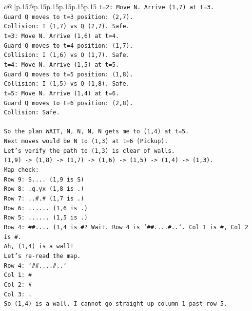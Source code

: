 \documentclass{article}
\begin{document}
{\begin{supertabular}{c@{$\;$}|p{.15\linewidth}@{}p{.15\linewidth}p{.15\linewidth}p{.15\linewidth}p{.15\linewidth}p{.15\linewidth}}
{{{\texttt{t=2: Move N. Arrive (1,7) at t=3.} \\
\texttt{Guard Q moves to t=3 position: (2,7).} \\
\texttt{Collision: I (1,7) vs Q (2,7). Safe.} \\
\texttt{t=3: Move N. Arrive (1,6) at t=4.} \\
\texttt{Guard Q moves to t=4 position: (1,7).} \\
\texttt{Collision: I (1,6) vs Q (1,7). Safe.} \\
\texttt{t=4: Move N. Arrive (1,5) at t=5.} \\
\texttt{Guard Q moves to t=5 position: (1,8).} \\
\texttt{Collision: I (1,5) vs Q (1,8). Safe.} \\
\texttt{t=5: Move N. Arrive (1,4) at t=6.} \\
\texttt{Guard Q moves to t=6 position: (2,8).} \\
\texttt{Collision: Safe.} \\
\\ 
\texttt{So the plan WAIT, N, N, N, N gets me to (1,4) at t=5.} \\
\texttt{Next moves would be N to (1,3) at t=6 (Pickup).} \\
\texttt{Let's verify the path to (1,3) is clear of walls.} \\
\texttt{(1,9) {-}> (1,8) {-}> (1,7) {-}> (1,6) {-}> (1,5) {-}> (1,4) {-}> (1,3).} \\
\texttt{Map check:} \\
\texttt{Row 9: S.... (1,9 is S)} \\
\texttt{Row 8: .q.yx (1,8 is .)} \\
\texttt{Row 7: ..\#.\# (1,7 is .)} \\
\texttt{Row 6: ...... (1,6 is .)} \\
\texttt{Row 5: ...... (1,5 is .)} \\
\texttt{Row 4: \#\#.... (1,4 is \#? Wait. Row 4 is `\#\#....\#..`. Col 1 is \#, Col 2 is \#.} \\
\texttt{Ah, (1,4) is a wall!} \\
\texttt{Let's re{-}read the map.} \\
\texttt{Row 4: `\#\#....\#..`} \\
\texttt{Col 1: \#} \\
\texttt{Col 2: \#} \\
\texttt{Col 3: .} \\
\texttt{So (1,4) is a wall. I cannot go straight up column 1 past row 5.} \\
}}}
\end{supertabular}}
\end{document}
